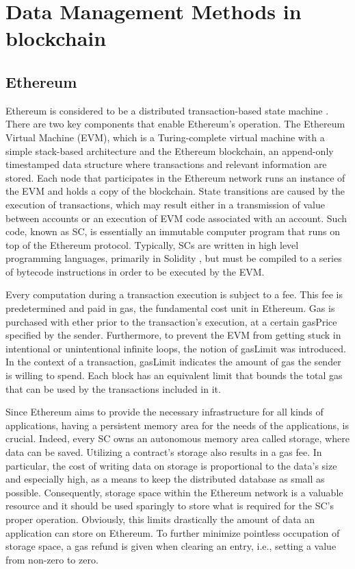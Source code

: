 \chapter{Data Management Methods in blockchain}\label{chapter:data_management}

\section{Ethereum}\label{sec:}
Ethereum is considered to be a distributed transaction-based state machine  \citep{wood_2014}. There are two key components that enable Ethereum’s operation. The Ethereum Virtual Machine (EVM), which is a Turing-complete virtual machine with a simple stack-based architecture and the Ethereum blockchain, an append-only timestamped data structure where transactions and relevant information are stored. Each node that participates in the Ethereum network runs an instance of the EVM and holds a copy of the blockchain. State transitions are caused by the execution of transactions, which may result either in a transmission of value between accounts or an execution of EVM code associated with an account. Such code, known as SC, is essentially an immutable computer program that runs on top of the Ethereum protocol. Typically, SCs are written in high level programming languages, primarily in Solidity  \citep{solidity}, but must be compiled to a series of bytecode instructions in order to be executed by the EVM.

Every computation during a transaction execution is subject to a fee. This fee is predetermined  \citep{wood_2014} and paid in gas, the fundamental cost unit in Ethereum. Gas is purchased with ether prior to the transaction’s execution, at a certain gasPrice specified by the sender. Furthermore, to prevent the EVM from getting stuck in intentional or unintentional infinite loops, the notion of gasLimit was introduced. In the context of a transaction, gasLimit indicates the amount of gas the sender is willing to spend. Each block has an equivalent limit that bounds the total gas that can be used by the transactions included in it.

Since Ethereum aims to provide the necessary infrastructure for all kinds of applications, having a persistent memory area for the needs of the applications, is crucial. Indeed, every SC owns an autonomous memory area called storage, where data can be saved. Utilizing a contract’s storage also results in a gas fee. In particular, the cost of writing data on storage is proportional to the data’s size and especially high, as a means to keep the distributed database as small as possible. Consequently, storage space within the Ethereum network is a valuable resource and it should be used sparingly to store what is required for the SC's proper operation. Obviously, this limits drastically the amount of data an application can store on Ethereum. To further minimize pointless occupation of storage space, a gas refund is given when clearing an entry, i.e., setting a value from non-zero to zero.

